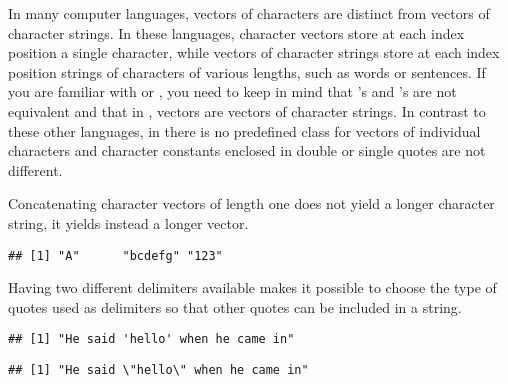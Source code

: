 \documentclass[krantz2]{krantz}\usepackage{knitr}
\begin{document}
\begin{explainbox}
In many computer languages, vectors of characters are distinct from vectors of character strings. In these languages, character vectors store at each index position a single character, while vectors of character strings store at each index position strings of characters of various lengths, such as words or sentences. If you are familiar with \Clang or \Cpplang, you need to keep in mind that \Clang's  and \Rlang's  are not equivalent and that in \Rlang,  vectors are vectors of character strings. In contrast to these other languages, in \Rlang there is no predefined class for vectors of individual characters and character constants enclosed in double or single quotes are not different.
\end{explainbox}

Concatenating character vectors of length one does not yield a longer character string, it yields instead a longer vector.
\begin{knitrout}\footnotesize
{}\color{fgcolor}\begin{kframe}
\begin{alltt}
 \hlkwb{<-} 
 \hlkwb{<-} 
 \hlkwb{<-} 
 \hlkwb{<-} 
\end{alltt}
\begin{verbatim}
## [1] "A"      "bcdefg" "123"
\end{verbatim}
\end{kframe}
\end{knitrout}

Having two different delimiters available makes it possible to choose the type of quotes used as delimiters so that other quotes can be included in a string.

\begin{knitrout}\footnotesize
{}\color{fgcolor}\begin{kframe}
\begin{alltt}
 \hlkwb{<-} 
\end{alltt}
\begin{verbatim}
## [1] "He said 'hello' when he came in"
\end{verbatim}
\begin{alltt}
 \hlkwb{<-} 
\end{alltt}
\begin{verbatim}
## [1] "He said \"hello\" when he came in"
\end{verbatim}
\end{kframe}
\end{knitrout}
\end{document}
